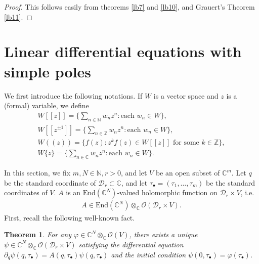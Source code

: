 \documentclass[12pt,b5paper,notitlepage]{report}
\theoremstyle{definition}
\theoremstyle{plain}
\newtheorem{thm}[df]{Theorem}
\newcommand{\mc}{\mathcal}
\newcommand{\End}{\mathrm{End}} %
\newcommand{\scr}{\mathscr}
\newcommand{\mbb}{\mathbb}
\newcommand{\blt}{\bullet}
\newcommand{\Cbb}{\mathbb C}
\numberwithin{equation}{section}
\begin{document}
\begin{proof}
This follows easily from theorems \ref{lb7} and \ref{lb10},  and Grauert's Theorem \ref{lb11}.
\end{proof}




\section{Linear differential equations with simple poles}


We first introduce the following notations. If $W$ is a vector space and $z$ is a (formal) variable, we  define 
\begin{gather*}
W[[z]]=\bigg\{\sum_{n\in\mathbb N}w_nz^n:\text{each }w_n\in W\bigg\},\\
W[[z^{\pm 1}]]=\bigg\{\sum_{n\in\mathbb Z}w_nz^n:\text{each }w_n\in W\bigg\},\\
W((z))=\Big\{f(z):z^kf(z)\in W[[z]]\text{ for some }k\in\mbb Z \Big\},\\
W\{z\}=\Big\{\sum_{n\in\mbb C}w_nz^n :\text{each $w_n\in W$}\Big\}.
\end{gather*}


In this section, we fix $m,N\in\mbb N,r>0$, and let $V$ be an open subset of $\mbb C^m$. Let $q$ be the standard coordinate of $\mc D_r\subset\mbb C$, and let $\tau_\blt=(\tau_1,\dots,\tau_m)$ be the standard coordinates of $V$. $A$ is an $\End(\Cbb^N)$-valued holomorphic function on $\mc D_r\times V$, i.e.
\begin{align*}
A\in\End(\Cbb^N)\otimes_\Cbb\scr O(\mc D_r\times V).
\end{align*}
First, recall the following well-known fact.


\begin{thm}\label{lb12}
For any  $\varphi\in\Cbb^N\otimes_\Cbb\scr O(V)$, there exists a unique  $\psi\in\Cbb^N\otimes_\Cbb\scr O(\mc D_r\times V)$ satisfying the differential equation $\partial_q\psi(q,\tau_\blt)=A(q,\tau_\blt)\psi(q,\tau_\blt)$ and the initial condition $\psi(0,\tau_\blt)=\varphi(\tau_\blt)$. 
\end{thm}
\end{document}
